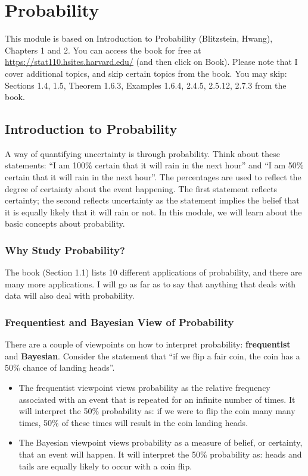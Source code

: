 \documentclass[
]{book}
\begin{document}
\chapter{Probability}\label{probability}

This module is based on Introduction to Probability (Blitzstein, Hwang), Chapters 1 and 2. You can access the book for free at \url{https://stat110.hsites.harvard.edu/} (and then click on Book). Please note that I cover additional topics, and skip certain topics from the book. You may skip: Sections 1.4, 1.5, Theorem 1.6.3, Examples 1.6.4, 2.4.5, 2.5.12, 2.7.3 from the book.

\section{Introduction to Probability}\label{introduction-to-probability}

A way of quantifying uncertainty is through probability. Think about these statements: ``I am 100\% certain that it will rain in the next hour'' and ``I am 50\% certain that it will rain in the next hour''. The percentages are used to reflect the degree of certainty about the event happening. The first statement reflects certainty; the second reflects uncertainty as the statement implies the belief that it is equally likely that it will rain or not. In this module, we will learn about the basic concepts about probability.

\subsection{Why Study Probability?}\label{why-study-probability}

The book (Section 1.1) lists 10 different applications of probability, and there are many more applications. I will go as far as to say that anything that deals with data will also deal with probability.

\subsection{Frequentiest and Bayesian View of Probability}\label{frequentiest-and-bayesian-view-of-probability}

There are a couple of viewpoints on how to interpret probability: \textbf{frequentist} and \textbf{Bayesian}. Consider the statement that ``if we flip a fair coin, the coin has a 50\% chance of landing heads''.

\begin{itemize}
\item
  The frequentist viewpoint views probability as the relative frequency associated with an event that is repeated for an infinite number of times. It will interpret the 50\% probability as: if we were to flip the coin many many times, 50\% of these times will result in the coin landing heads.
\item
  The Bayesian viewpoint views probability as a measure of belief, or certainty, that an event will happen. It will interpret the 50\% probability as: heads and tails are equally likely to occur with a coin flip.
\end{itemize}
\end{document}

